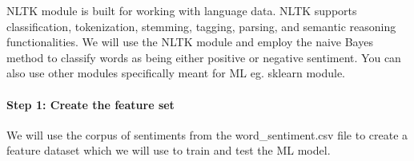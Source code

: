 \documentclass[11pt]{article}
\begin{document}
NLTK module is built for working with language data. NLTK supports
classification, tokenization, stemming, tagging, parsing, and semantic
reasoning functionalities. We will use the NLTK module and employ the
naive Bayes method to classify words as being either positive or
negative sentiment. You can also use other modules specifically meant
for ML eg. sklearn module.

\paragraph{Step 1: Create the feature
set}\label{step-1-create-the-feature-set}

We will use the corpus of sentiments from the word\_sentiment.csv file
to create a feature dataset which we will use to train and test the ML
model.
\end{document}
